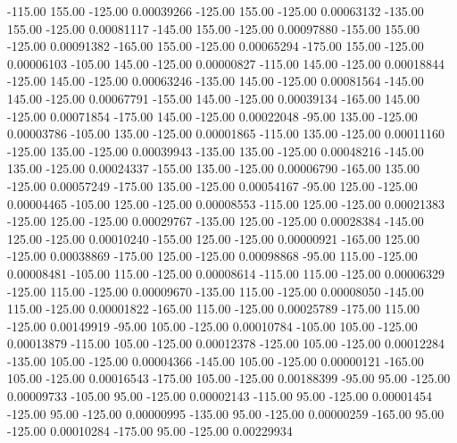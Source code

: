    -115.00    155.00   -125.00     0.00039266
   -125.00    155.00   -125.00     0.00063132
   -135.00    155.00   -125.00     0.00081117
   -145.00    155.00   -125.00     0.00097880
   -155.00    155.00   -125.00     0.00091382
   -165.00    155.00   -125.00     0.00065294
   -175.00    155.00   -125.00     0.00006103
   -105.00    145.00   -125.00     0.00000827
   -115.00    145.00   -125.00     0.00018844
   -125.00    145.00   -125.00     0.00063246
   -135.00    145.00   -125.00     0.00081564
   -145.00    145.00   -125.00     0.00067791
   -155.00    145.00   -125.00     0.00039134
   -165.00    145.00   -125.00     0.00071854
   -175.00    145.00   -125.00     0.00022048
    -95.00    135.00   -125.00     0.00003786
   -105.00    135.00   -125.00     0.00001865
   -115.00    135.00   -125.00     0.00011160
   -125.00    135.00   -125.00     0.00039943
   -135.00    135.00   -125.00     0.00048216
   -145.00    135.00   -125.00     0.00024337
   -155.00    135.00   -125.00     0.00006790
   -165.00    135.00   -125.00     0.00057249
   -175.00    135.00   -125.00     0.00054167
    -95.00    125.00   -125.00     0.00004465
   -105.00    125.00   -125.00     0.00008553
   -115.00    125.00   -125.00     0.00021383
   -125.00    125.00   -125.00     0.00029767
   -135.00    125.00   -125.00     0.00028384
   -145.00    125.00   -125.00     0.00010240
   -155.00    125.00   -125.00     0.00000921
   -165.00    125.00   -125.00     0.00038869
   -175.00    125.00   -125.00     0.00098868
    -95.00    115.00   -125.00     0.00008481
   -105.00    115.00   -125.00     0.00008614
   -115.00    115.00   -125.00     0.00006329
   -125.00    115.00   -125.00     0.00009670
   -135.00    115.00   -125.00     0.00008050
   -145.00    115.00   -125.00     0.00001822
   -165.00    115.00   -125.00     0.00025789
   -175.00    115.00   -125.00     0.00149919
    -95.00    105.00   -125.00     0.00010784
   -105.00    105.00   -125.00     0.00013879
   -115.00    105.00   -125.00     0.00012378
   -125.00    105.00   -125.00     0.00012284
   -135.00    105.00   -125.00     0.00004366
   -145.00    105.00   -125.00     0.00000121
   -165.00    105.00   -125.00     0.00016543
   -175.00    105.00   -125.00     0.00188399
    -95.00     95.00   -125.00     0.00009733
   -105.00     95.00   -125.00     0.00002143
   -115.00     95.00   -125.00     0.00001454
   -125.00     95.00   -125.00     0.00000995
   -135.00     95.00   -125.00     0.00000259
   -165.00     95.00   -125.00     0.00010284
   -175.00     95.00   -125.00     0.00229934
